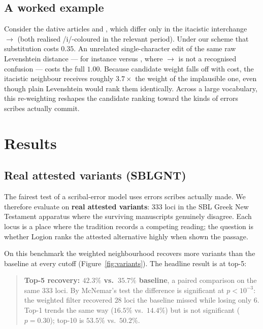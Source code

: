 \documentclass[11pt]{article}
\newcommand{\tais}{\texttau\textalpha\textiota\textfinalsigma}
\newcommand{\tois}{\texttau\textomicron\textiota\textfinalsigma}
\newcommand{\tis}{\texttau\textiota\textfinalsigma}
\newcommand{\ois}{\textomicron\textiota\textfinalsigma}
\begin{document}
\subsection{A worked example}

Consider the dative articles \tais{} and \tois{}, which differ only in the
itacistic interchange \textalpha\textiota${\to}$\textomicron\textiota{} (both
realised /i/-coloured in the relevant period). Under our scheme that substitution
costs $0.35$. An unrelated single-character edit of the same raw
Levenshtein distance --- for instance \tis{} versus \ois{}, where
\texttau${\to}$\textomicron{} is not a recognised confusion --- costs the full
$1.00$. Because candidate weight falls off with cost, the itacistic
neighbour receives roughly $3.7\times$ the weight of the implausible one, even
though plain Levenshtein would rank them identically. Across a large
vocabulary, this re-weighting reshapes the candidate ranking toward the kinds of
errors scribes actually commit.

\section{Results}

\subsection{Real attested variants (SBLGNT)}

The fairest test of a scribal-error model uses errors scribes actually made.
We therefore evaluate on \textbf{real attested variants}: $333$ loci in the SBL
Greek New Testament apparatus where the surviving manuscripts genuinely disagree.
Each locus is a place where the tradition records a competing reading; the question
is whether Logion ranks the attested alternative highly when shown the passage.

On this benchmark the weighted neighbourhood recovers more variants than the
baseline at every cutoff (Figure~\ref{fig:variants}). The headline result is at
top-5:

\begin{quote}
\textbf{Top-5 recovery: $42.3\%$ vs.\ $35.7\%$ baseline}, a paired comparison
on the same $333$ loci. By McNemar's test the difference is significant at
$p<10^{-3}$: the weighted filter recovered $28$ loci the baseline missed while
losing only $6$. Top-1 trends the same way ($16.5\%$ vs.\
$14.4\%$) but is not significant ($p=0.30$); top-10 is
$53.5\%$ vs.\ $50.2\%$.
\end{quote}
\end{document}
